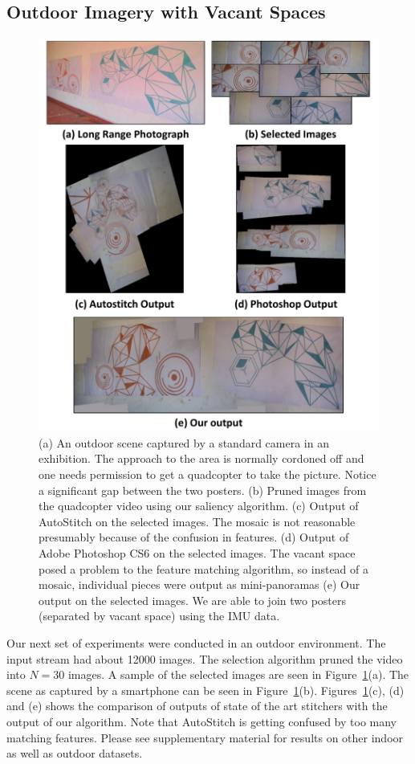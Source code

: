 \subsection{Outdoor Imagery with Vacant Spaces}

\begin{figure}[h!]
\centering
\includegraphics[width=0.86\linewidth]{figures/orange_blue}
\caption[Result: Outdoor Exhibition]{(a) An outdoor scene captured by a standard
camera in an exhibition. The approach to the area is normally cordoned off and one
  needs permission to get a quadcopter to take the picture.  Notice a
  significant gap between the two posters.  (b) Pruned images from the
  quadcopter video using our saliency algorithm. (c) Output of
  AutoStitch on the selected images. The mosaic is not reasonable
  presumably because of the confusion in features. (d) Output of Adobe
  Photoshop CS6 on the selected images. The vacant space posed a
  problem to the feature matching algorithm, so instead of a mosaic,
  individual pieces were output as mini-panoramas (e) Our output on
  the selected images. We are able to join two posters (separated by
  vacant space) using the IMU data.}
\label{fig:results}
\end{figure}

Our next set of experiments were conducted in an outdoor
environment. The input stream had about 12000 images. The selection
algorithm pruned the video into $N=30$ images. A sample of the
selected images are seen in Figure~\ref{fig:results}(a).  The scene as
captured by a smartphone can be seen in Figure~\ref{fig:results}(b).
Figures~\ref{fig:results}(c), (d) and (e) shows the comparison of outputs of
state of the art stitchers with the output of our algorithm. Note that
AutoStitch is getting confused by too many matching features. 
Please see supplementary material for results on other indoor as well as outdoor datasets.

